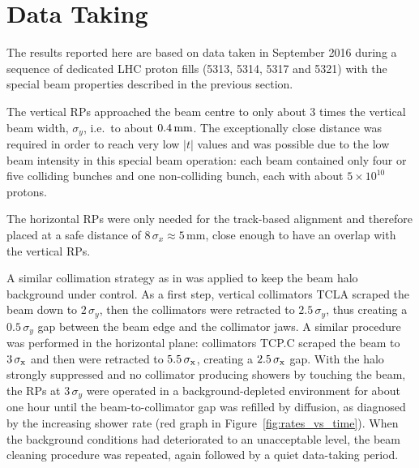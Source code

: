 \section{Data Taking}
\label{sec:data taking}

The results reported here are based on data taken in September 2016 during a sequence of dedicated LHC proton fills (5313, 5314, 5317 and 5321) with the special beam properties described in the previous section.



The vertical RPs approached the beam centre to only about 3 times the vertical beam width, $\sigma_{y}$, i.e.~to about $0.4\,{\rm mm}$. The exceptionally close distance was required in order to reach very low $|t|$ values and was possible due to the low beam intensity in this special beam operation: each beam contained only four or five colliding bunches and one non-colliding bunch, each with about $5\times 10^{10}$ protons.

The horizontal RPs were only needed for the track-based alignment and therefore placed at a safe distance of $8\,\sigma_{x} \approx 5$\,mm, close enough to have an overlap with the vertical RPs.

A similar collimation strategy as in \cite{totem-8tev-1km} was applied to keep the beam halo background under control. As a first step, vertical collimators TCLA scraped the beam down to $2\,\sigma_{y}$, then the collimators were retracted to $2.5\,\sigma_{y}$, thus creating a $0.5\,\sigma_{y}$ gap between the beam edge and the collimator jaws. A similar procedure was performed in the horizontal plane: collimators TCP.C scraped the beam to $3\,{\rm \sigma_{x}}$ and then were retracted to $5.5\,{\rm \sigma_{x}}$, creating a $2.5\,{\rm \sigma_x}$ gap. With the halo strongly suppressed and no collimator producing showers by touching the beam, the RPs at $3\,\sigma_{y}$ were operated in a background-depleted environment for about one hour until the beam-to-collimator gap was refilled by diffusion, as diagnosed by the increasing shower rate (red graph in Figure~\ref{fig:rates_vs_time}). When the background conditions had deteriorated to an unacceptable level, the beam cleaning procedure was repeated, again followed by a quiet data-taking period.

